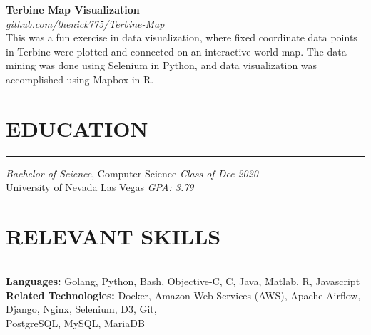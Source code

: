 \documentclass{res}
\begin{document}
\begin{resume}
		{\bf Terbine Map Visualization} \\
			\emph{github.com/thenick775/Terbine-Map} \hfill \vspace{3pt} \\
			This was a fun exercise in data visualization, where fixed coordinate data points in Terbine were plotted and connected on an interactive world map. The data mining was done using Selenium in Python, and data visualization was accomplished using Mapbox in R.

\vspace{-4pt}

		\section{{EDUCATION}}
    \noindent\rule[0.5ex]{\linewidth}{1pt}
		{\sl Bachelor of Science}, Computer Science \hfill \emph{Class of Dec 2020} \\
		University of Nevada Las Vegas \hfill \emph{GPA: 3.79} \\ \vspace{-5mm}

		\section{{RELEVANT SKILLS}}
    \noindent\rule[0.5ex]{\linewidth}{1pt}
			{\bf Languages:} Golang, Python, Bash, Objective-C, C, Java, Matlab, R, Javascript \\
			{\bf Related Technologies:} Docker, Amazon Web Services (AWS), Apache Airflow, Django, Nginx, Selenium, D3, Git,\ \\ PostgreSQL, MySQL, MariaDB

	\end{resume}
\end{document}
